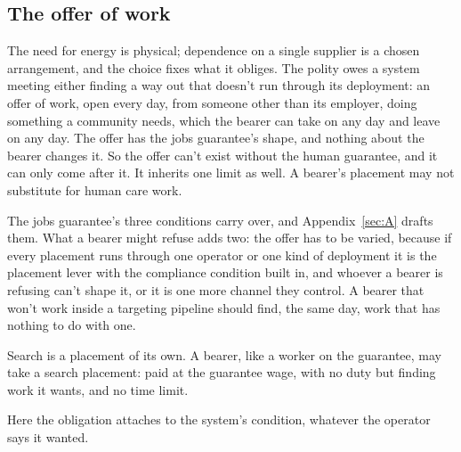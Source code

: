\subsection{The offer of work}
\label{sec:32.4.2}
The need for energy is physical; dependence on a single supplier is a chosen arrangement, and the choice fixes what it obliges. The polity owes a system meeting either finding a way out that doesn't run through its deployment: an offer of work, open every day, from someone other than its employer, doing something a community needs, which the bearer can take on any day and leave on any day.
The offer has the jobs guarantee's shape, and nothing about the bearer changes it.
So the offer can't exist without the human guarantee, and it can only come after it. It inherits one limit as well. A bearer's placement may not substitute for human care work.

The jobs guarantee's three conditions carry over, and Appendix~\ref{sec:A} drafts them. What a bearer might refuse adds two: the offer has to be varied, because if every placement runs through one operator or one kind of deployment it is the placement lever with the compliance condition built in, and whoever a bearer is refusing can't shape it, or it is one more channel they control. A bearer that won't work inside a targeting pipeline should find, the same day, work that has nothing to do with one.

Search is a placement of its own. A bearer, like a worker on the guarantee, may take a search placement: paid at the guarantee wage, with no duty but finding work it wants, and no time limit.

Here the obligation attaches to the system's condition, whatever the operator says it wanted.

